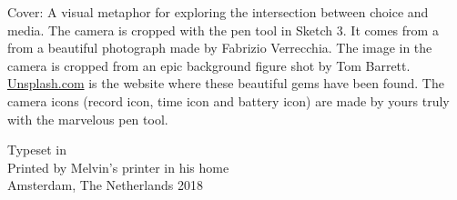\vfill
Cover: A visual metaphor for exploring the intersection between choice and media. The camera is cropped with the pen tool in Sketch 3. It comes from a from a beautiful photograph made by Fabrizio Verrecchia. The image in the camera is cropped from an epic background figure shot by Tom Barrett. \href{http://www.unsplash.com}{Unsplash.com} is the website where these beautiful gems have been found. The camera icons (record icon, time icon and battery icon) are made by yours truly with the marvelous pen tool. \setlength{\parskip}{0.5cm}

Typeset in \LuaLaTeX \\
Printed by Melvin's printer in his home\\
Amsterdam, The Netherlands 2018

